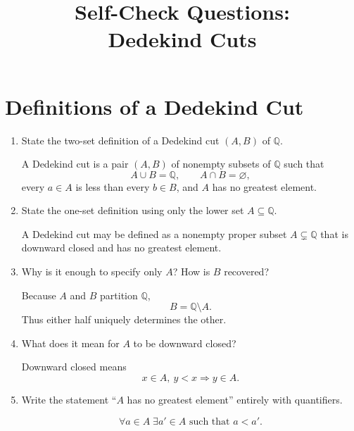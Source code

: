 \documentclass{essay}
\title{Self-Check Questions:\\Dedekind Cuts}
\author{}
\date{}
\begin{document}
\maketitle
\tableofcontents
\newpage

\section{Definitions of a Dedekind Cut}

\begin{enumerate}[label=\arabic*., itemsep=10pt]

\item State the two-set definition of a Dedekind cut $(A,B)$ of $\mathbb{Q}$.

\begin{answer}
A Dedekind cut is a pair $(A,B)$ of nonempty subsets of $\mathbb{Q}$ such that
\[
A\cup B=\mathbb{Q},\qquad A\cap B=\varnothing,
\]
every $a\in A$ is less than every $b\in B$, and $A$ has no greatest element.
\end{answer}

\item State the one-set definition using only the lower set $A\subseteq\mathbb{Q}$.

\begin{answer}
A Dedekind cut may be defined as a nonempty proper subset $A\subsetneq\mathbb{Q}$ that is downward closed and has no greatest element.
\end{answer}

\item Why is it enough to specify only $A$? How is $B$ recovered?

\begin{answer}
Because $A$ and $B$ partition $\mathbb{Q}$,
\[
B=\mathbb{Q}\setminus A.
\]
Thus either half uniquely determines the other.
\end{answer}

\item What does it mean for $A$ to be downward closed?

\begin{answer}
Downward closed means
\[
x\in A,\ y<x \Longrightarrow y\in A.
\]
\end{answer}

\item Write the statement ``$A$ has no greatest element'' entirely with quantifiers.

\begin{answer}
\[
\forall a\in A\;\exists a'\in A\text{ such that }a<a'.
\]
\end{answer}


\end{enumerate}
\end{document}
